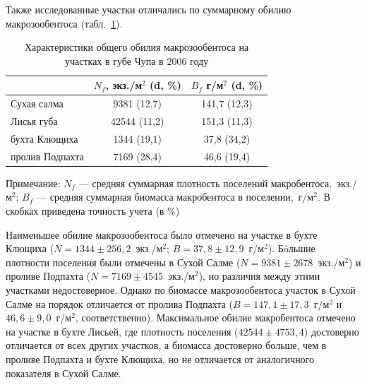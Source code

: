 Также исследованные участки отличались по суммарному обилию макрозообентоса (табл.~\ref{tab:NB_fauna_spat}). 
	\begin{table}[p]
	\caption{Характеристики общего обилия макрозообентоса  на участках в губе Чупа в 2006 году}
	\label{tab:NB_fauna_spat}
	\begin{center}
		\begin{tabular}{|l|c|c|}
		\hline
		                & $N_f$, экз./м$^2$ (d, \%) & $B_f$ г/м$^2$ (d, \%)      \\ \hline 
		Сухая салма     & 9381 (12,7) & 141,7 (12,3) \\
		Лисья губа      & 42544 (11,2) & 151,3  (11,3) \\
		бухта Клющиха   & 1344 (19,1) & 37,8 (34,2) \\
		пролив Подпахта & 7169 (28,4) & 46,6 (19,4) \\ \hline
		\end{tabular}
	\end{center}

\footnotesize{Примечание: $N_f$ --- средняя суммарная плотность поселений макробентоса,~экз./м$^2$; $B_f$ --- средняя суммарная биомасса макробентоса в поселении,~г/м$^2$. В скобках приведена точность учета (в \%)}
	\end{table}
Наименьшее обилие макрозообентоса было отмечено на участке в бухте Клющиха ($N = 1344 \pm 256,2$~экз./м$^2$; $B = 37,8 \pm 12,9$~г/м$^2$). 
Б\'{o}льшие плотности поселения были отмечены в Сухой Салме ($N = 9381 \pm 2678$~экз./м$^2$) и проливе Подпахта ($N = 7169 \pm 4545$~экз./м$^2$), но различия между этими участками недостоверное. 
Однако по биомассе макрозообентоса участок в Сухой Салме на порядок отличается от пролива Подпахта ($B = 147,1 \pm 17,3$~г/м$^2$ и $46,6 \pm 9,0$~г/м$^2$, соответственно). 
Максимальное обилие макробентоса отмечено на участке в бухте Лисьей, где плотность поселения ($42544 \pm 4753,4$) достоверно отличается от всех других участков, а биомасса достоверно больше, чем в проливе Подпахта и бухте Клющиха, но не отличается от аналогичного показателя в Сухой Салме.

